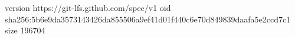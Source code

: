 version https://git-lfs.github.com/spec/v1
oid sha256:5b6e9da3573143426da855506a9ef41d01f440c6e70d849839daafa5e2ccd7c1
size 196704
